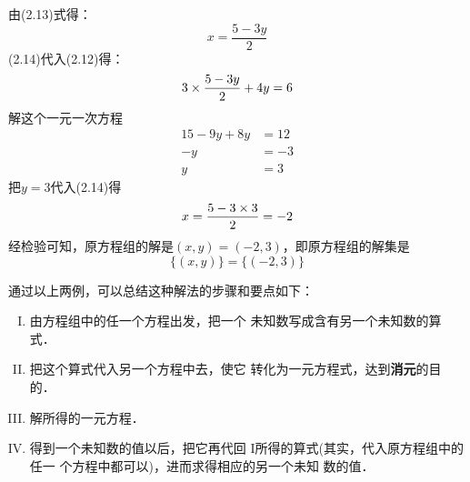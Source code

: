 \begin{solution}
由(2.13)式得：
\begin{equation}
    x=\frac{5-3y}{2}
\end{equation}
(2.14)代入(2.12)得：
\[3\times \dfrac{5-3y}{2}+4y=6 \]
解这个一元一次方程
\[\begin{split}
    15-9y+8y&=12\\
    -y&=-3\\
    y&=3
\end{split}\]
把$y=3$代入(2.14)得
\[x=\dfrac{5-3\times 3}{2}=-2\]
经检验可知，原方程组的解是$(x,y)=(-2,3)$，即原方程组的解集是
\[\{(x,y)\}=\{(-2,3)\} \]
\end{solution}

通过以上两例，可以总结这种解法的步骤和要点如下：
\begin{blk}{}
\begin{enumerate}[I. ]
    \item 由方程组中的任一个方程出发，把一个
    未知数写成含有另一个未知数的算式．
    \item 把这个算式代入另一个方程中去，使它
    转化为一元方程式，达到\textbf{消元}的目的．
    \item 解所得的一元方程．
    \item 得到一个未知数的值以后，把它再代回
    I所得的算式(其实，代入原方程组中的任一
    个方程中都可以)，进而求得相应的另一个未知
    数的值．
\end{enumerate}    
\end{blk}

